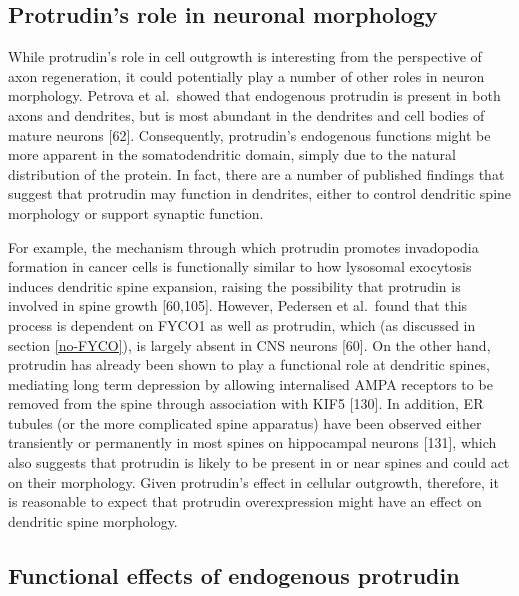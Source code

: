 \documentclass[
  12pt,
  a4paper,
]{book}
\begin{document}
\subsection{Protrudin's role in neuronal morphology}\label{protrudins-role-in-neuronal-morphology}

While protrudin's role in cell outgrowth is interesting from the perspective of axon regeneration, it could potentially play a number of other roles in neuron morphology. Petrova et al.~showed that endogenous protrudin is present in both axons and dendrites, but is most abundant in the dendrites and cell bodies of mature neurons {[}62{]}. Consequently, protrudin's endogenous functions might be more apparent in the somatodendritic domain, simply due to the natural distribution of the protein. In fact, there are a number of published findings that suggest that protrudin may function in dendrites, either to control dendritic spine morphology or support synaptic function.

For example, the mechanism through which protrudin promotes invadopodia formation in cancer cells is functionally similar to how lysosomal exocytosis induces dendritic spine expansion, raising the possibility that protrudin is involved in spine growth {[}60,105{]}. However, Pedersen et al.~found that this process is dependent on FYCO1 as well as protrudin, which (as discussed in section \ref{no-FYCO}), is largely absent in CNS neurons {[}60{]}. On the other hand, protrudin has already been shown to play a functional role at dendritic spines, mediating long term depression by allowing internalised AMPA receptors to be removed from the spine through association with KIF5 {[}130{]}. In addition, ER tubules (or the more complicated spine apparatus) have been observed either transiently or permanently in most spines on hippocampal neurons {[}131{]}, which also suggests that protrudin is likely to be present in or near spines and could act on their morphology. Given protrudin's effect in cellular outgrowth, therefore, it is reasonable to expect that protrudin overexpression might have an effect on dendritic spine morphology.

\subsection{Functional effects of endogenous protrudin}\label{functional-effects-of-endogenous-protrudin}
\end{document}
